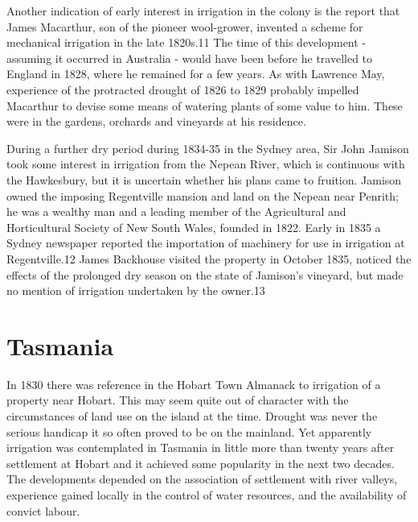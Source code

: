 Another indication of early interest in irrigation in the colony is
the report that James Macarthur, son of the pioneer wool-grower,
invented a scheme for mechanical irrigation in the late 1820s.11 The
time of this development - assuming it occurred in Australia - would
have been before he travelled to England in 1828, where he remained
for a few years. As with Lawrence May, experience of the protracted
drought of 1826 to 1829 probably impelled Macarthur to devise some
means of watering plants of some value to him. These were in the
gardens, orchards and vineyards at his residence.

During a further dry period during 1834-35 in the Sydney area, Sir
John Jamison took some interest in irrigation from the Nepean River,
which is continuous with the Hawkesbury, but it is uncertain whether
his plans came to fruition. Jamison owned the imposing Regentville
mansion and land on the Nepean near Penrith; he was a wealthy man and
a leading member of the Agricultural and Horticultural Society of New
South Wales, founded in 1822. Early in 1835 a Sydney newspaper
reported the importation of machinery for use in irrigation at
Regentville.12 James Backhouse visited the property in October 1835,
noticed the effects of the prolonged dry season on the state of
Jamison's vineyard, but made no mention of irrigation undertaken by
the owner.13

\section{Tasmania}

In 1830 there was reference in the Hobart Town Almanack to irrigation of a property near Hobart. This may seem quite out of character with the circumstances of land use on the island at the time. Drought was never the serious handicap it so often proved to be on the mainland. Yet apparently irrigation was contemplated in Tasmania in little more than twenty years after settlement at Hobart and it achieved some popularity in the next two decades. The developments depended on the association of settlement with river valleys, experience gained locally in the control of water resources, and the availability of convict labour.

